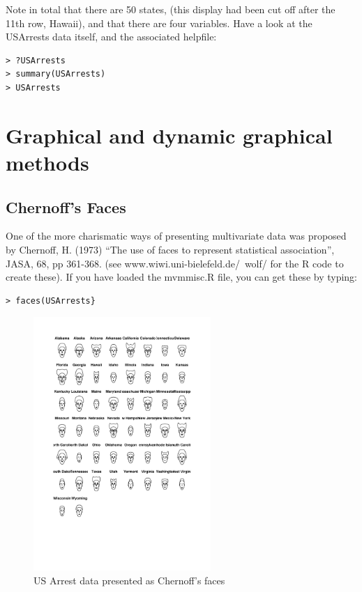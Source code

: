 Note in total that there are 50 states, (this display had been cut off after the 11th row, Hawaii), and that there are four variables.   Have a look at the USArrests data itself, and the associated helpfile:

\begin{verbatim}
> ?USArrests
> summary(USArrests)
> USArrests
\end{verbatim}


\section{Graphical and dynamic graphical methods}
\label{eda}



\subsection{Chernoff's Faces}

One of the more charismatic ways of presenting multivariate data was proposed by Chernoff, H. (1973) ``The use of faces to represent statistical association'', JASA, 68, pp 361-368. (see www.wiwi.uni-bielefeld.de/~wolf/ for the R code to create these).   If you have loaded the mvmmisc.R file, you can get these by typing:

\begin{verbatim}
> faces(USArrests}
\end{verbatim}


\begin{figure}
\begin{center}
\includegraphics[width = 0.6\textwidth]{images/faces}
\caption{US Arrest data presented as Chernoff's faces}
\end{center}
\end{figure}


